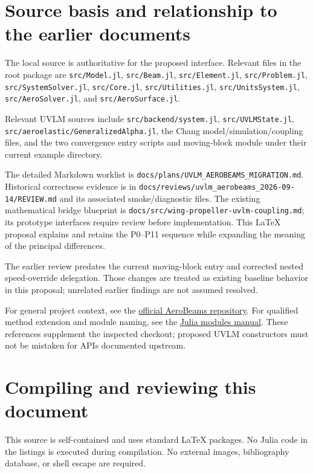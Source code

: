 \documentclass[11pt,a4paper]{article}
\newcommand{\code}{\nolinkurl}
\begin{document}
\appendix
\section{Source basis and relationship to the earlier documents}

The local source is authoritative for the proposed interface. Relevant files
in the root package are \code{src/Model.jl}, \code{src/Beam.jl},
\code{src/Element.jl}, \code{src/Problem.jl}, \code{src/SystemSolver.jl},
\code{src/Core.jl}, \code{src/Utilities.jl}, \code{src/UnitsSystem.jl},
\code{src/AeroSolver.jl}, and \code{src/AeroSurface.jl}.

Relevant UVLM sources include \code{src/backend/system.jl},
\code{src/UVLMState.jl}, \code{src/aeroelastic/GeneralizedAlpha.jl},
the Chang model/simulation/coupling files, and the two convergence entry
scripts and moving-block module under their current example directory.

The detailed Markdown worklist is
\code{docs/plans/UVLM_AEROBEAMS_MIGRATION.md}. Historical correctness evidence
is in \code{docs/reviews/uvlm_aerobeams_2026-09-14/REVIEW.md} and its associated
smoke/diagnostic files. The existing mathematical bridge blueprint is
\code{docs/src/wing-propeller-uvlm-coupling.md}; its prototype interfaces require
review before implementation. This LaTeX proposal explains and retains the
P0--P11 sequence while expanding the meaning of the principal differences.

The earlier review predates the current moving-block entry and corrected
nested speed-override delegation. Those changes are treated as existing
baseline behavior in this proposal; unrelated earlier findings are not
assumed resolved.

For general project context, see the
\href{https://github.com/luizpancini/AeroBeams.jl}{official AeroBeams repository}.
For qualified method extension and module naming, see the
\href{https://docs.julialang.org/en/v1/manual/modules/}{Julia modules manual}.
These references supplement the inspected checkout; proposed UVLM constructors
must not be mistaken for APIs documented upstream.

\section{Compiling and reviewing this document}

This source is self-contained and uses standard LaTeX packages. No Julia
code in the listings is executed during compilation. No external images,
bibliography database, or shell escape are required.
\end{document}
